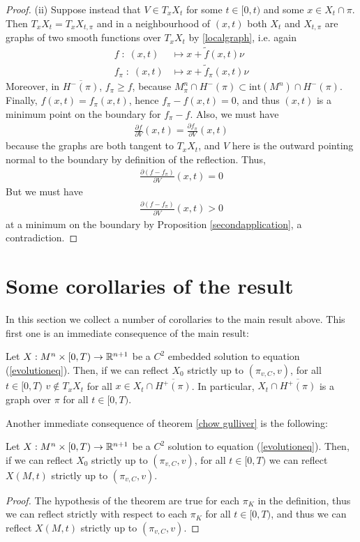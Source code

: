 \begin{proof}
	(ii) Suppose instead that $V\in T_xX_t$  for some $t\in [0, t)$ and some $x\in X_t\cap \pi$. Then $T_xX_t= T_xX_{t, \pi}$ and in a neighbourhood of $(x, t)$ both $X_t$ and $X_{t, \pi}$ are graphs of two smooth functions over $T_xX_t$ by \ref{localgraph}, i.e. again
	\begin{align*}
		f \; : \; (x, t) &\mapsto x+\tilde{f}(x, t)\nu \\
		f_\pi \; : \; (x, t) &\mapsto x+\tilde{f}_\pi(x, t)\nu 
	\end{align*} 
	Moreover, in $\overline{H^-(\pi)}$, $f_\pi\geq f$, because $M^n_\pi\cap H^-(\pi)\subset \mathrm{int}(M^n)\cap H^-(\pi)$. Finally, $f(x, t)=f_\pi (x, t)$, hence $f_\pi-f (x, t)=0$, and thus  $(x, t)$ is a minimum point on the boundary for $f_\pi-f$. Also, we must have
	\begin{align*}
		\frac{\partial f}{\partial V}(x,t)=\frac{\partial f_\pi}{\partial V}(x,t)
	\end{align*}
	because the graphs are both tangent to $T_xX_t$, and $V$ here is the outward pointing normal to the boundary by definition of the reflection. Thus, 
	\begin{align*}
		\frac{\partial (f- f_\pi)}{\partial V}(x,t)=0
	\end{align*}
	But we must have 
	\begin{align*}
		\frac{\partial (f- f_\pi)}{\partial V}(x,t)>0
	\end{align*}
	at a minimum on the boundary by Proposition \ref{secondapplication}, a contradiction.  
\end{proof}


\section{Some corollaries of the result} \label{Some corollaries of the result}
In this section we collect a number of corollaries to the main result above. This first one is an immediate consequence of the main result:
\begin{cor}
	Let $X:M^n\times [0,T) \rightarrow \mathbb{R}^{n+1}$ be a $C^2$ embedded solution to equation (\ref{evolutioneq}). Then, if we can reflect $X_0$ strictly up to $(\pi_{v,C},v)$, for all $t\in [0,T)$ $v\notin T_xX_t$ for all $x\in X_t\cap\overline{H^+(\pi)}$. In particular,  $ X_t\cap\overline{H^+(\pi)}$ is a graph over $\pi$ for all $t\in [0,T)$.\label{graph}
\end{cor}




Another immediate consequence of theorem \ref{chow gulliver} is the following:
\begin{cor}
	Let $X:M^n\times [0,T) \rightarrow \mathbb{R}^{n+1}$ be a $C^2$ solution to equation (\ref{evolutioneq}). Then, if we can reflect $X_0$ strictly up to $(\pi_{v,C},v)$, for all $t\in [0,T)$ we can reflect $X(M, t)$ strictly up to $(\pi_{v,C},v)$. \label{upto}
\end{cor}
\begin{proof}
	The hypothesis of the theorem are true for each $\pi_K$ in the definition, thus we can reflect strictly with respect to each $\pi_K$ for all $t\in[0,T)$, and thus we can reflect $X(M, t)$ strictly up to $(\pi_{v,C},v)$.
\end{proof}

